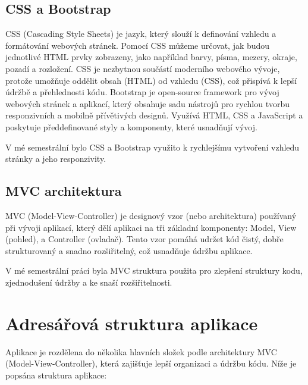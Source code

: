 \documentclass[12pt, a4paper]{report}
\begin{document}
\subsection{CSS a Bootstrap}
CSS (Cascading Style Sheets) je jazyk, který slouží k definování vzhledu a formátování webových stránek. Pomocí CSS můžeme určovat, jak budou jednotlivé HTML prvky zobrazeny, jako například barvy, písma, mezery, okraje, pozadí a rozložení. CSS je nezbytnou součástí moderního webového vývoje, protože umožňuje oddělit obsah (HTML) od vzhledu (CSS), což přispívá k lepší údržbě a přehlednosti kódu.
\newline
Bootstrap je open-source framework pro vývoj webových stránek a aplikací, který obsahuje sadu nástrojů pro rychlou tvorbu responzivních a mobilně přívětivých designů. Využívá HTML, CSS a JavaScript a poskytuje předdefinované styly a komponenty, které usnadňují vývoj.

V mé semestrální bylo CSS a Bootstrap využito k rychlejšímu vytvoření vzhledu stránky a jeho responzivity.

\subsection{MVC architektura}
MVC (Model-View-Controller) je designový vzor (nebo architektura) používaný při vývoji aplikací, který dělí aplikaci na tři základní komponenty: Model, View (pohled), a Controller (ovladač). Tento vzor pomáhá udržet kód čistý, dobře strukturovaný a snadno rozšiřitelný, což usnadňuje údržbu aplikace.

V mé semestrální prácí byla MVC struktura použita pro zlepšení struktury kodu, zjednodušení údržby a ke snaší rozšiřitelnosti.
\section{Adresářová struktura aplikace}
Aplikace je rozdělena do několika hlavních složek podle architektury MVC (Model-View-Controller), která zajišťuje lepší organizaci a údržbu kódu. Níže je popsána struktura aplikace:
\end{document}
